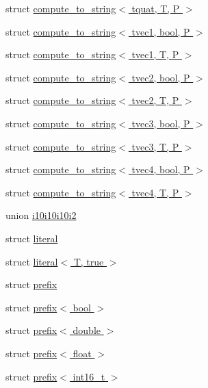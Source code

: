 \begin{DoxyCompactItemize}
struct \hyperlink{structglm_1_1detail_1_1compute__to__string_3_01tquat_00_01_t_00_01_p_01_4}{compute\+\_\+to\+\_\+string$<$ tquat, T, P $>$}
\item 
struct \hyperlink{structglm_1_1detail_1_1compute__to__string_3_01tvec1_00_01bool_00_01_p_01_4}{compute\+\_\+to\+\_\+string$<$ tvec1, bool, P $>$}
\item 
struct \hyperlink{structglm_1_1detail_1_1compute__to__string_3_01tvec1_00_01_t_00_01_p_01_4}{compute\+\_\+to\+\_\+string$<$ tvec1, T, P $>$}
\item 
struct \hyperlink{structglm_1_1detail_1_1compute__to__string_3_01tvec2_00_01bool_00_01_p_01_4}{compute\+\_\+to\+\_\+string$<$ tvec2, bool, P $>$}
\item 
struct \hyperlink{structglm_1_1detail_1_1compute__to__string_3_01tvec2_00_01_t_00_01_p_01_4}{compute\+\_\+to\+\_\+string$<$ tvec2, T, P $>$}
\item 
struct \hyperlink{structglm_1_1detail_1_1compute__to__string_3_01tvec3_00_01bool_00_01_p_01_4}{compute\+\_\+to\+\_\+string$<$ tvec3, bool, P $>$}
\item 
struct \hyperlink{structglm_1_1detail_1_1compute__to__string_3_01tvec3_00_01_t_00_01_p_01_4}{compute\+\_\+to\+\_\+string$<$ tvec3, T, P $>$}
\item 
struct \hyperlink{structglm_1_1detail_1_1compute__to__string_3_01tvec4_00_01bool_00_01_p_01_4}{compute\+\_\+to\+\_\+string$<$ tvec4, bool, P $>$}
\item 
struct \hyperlink{structglm_1_1detail_1_1compute__to__string_3_01tvec4_00_01_t_00_01_p_01_4}{compute\+\_\+to\+\_\+string$<$ tvec4, T, P $>$}
\item 
union \hyperlink{unionglm_1_1detail_1_1i10i10i10i2}{i10i10i10i2}
\item 
struct \hyperlink{structglm_1_1detail_1_1literal}{literal}
\item 
struct \hyperlink{structglm_1_1detail_1_1literal_3_01_t_00_01true_01_4}{literal$<$ T, true $>$}
\item 
struct \hyperlink{structglm_1_1detail_1_1prefix}{prefix}
\item 
struct \hyperlink{structglm_1_1detail_1_1prefix_3_01bool_01_4}{prefix$<$ bool $>$}
\item 
struct \hyperlink{structglm_1_1detail_1_1prefix_3_01double_01_4}{prefix$<$ double $>$}
\item 
struct \hyperlink{structglm_1_1detail_1_1prefix_3_01float_01_4}{prefix$<$ float $>$}
\item 
struct \hyperlink{structglm_1_1detail_1_1prefix_3_01int16__t_01_4}{prefix$<$ int16\+\_\+t $>$}

\end{DoxyCompactItemize}
